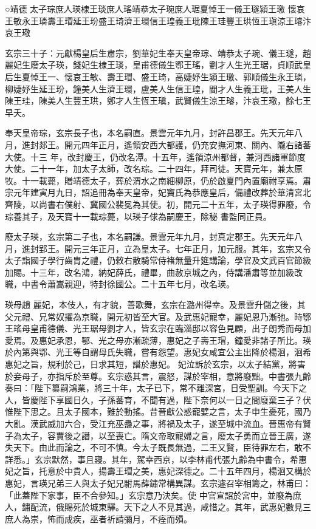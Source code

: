 
\begin{pinyinscope}

 ○靖德
 太子琮庶人瑛棣王琰庶人瑤靖恭太子琬庶人琚夏悼王一儀王璲潁王璬
 懷哀王敏永王璘壽王瑁延王玢盛王琦濟王環信王瑝義王玭陳王珪豐王珙恆王瑱涼王璿汴哀王璥



 玄宗三十子：元獻楊皇后生肅宗，劉華妃生奉天皇帝琮、靖恭太子琬、儀王璲，趙麗妃生廢太子瑛，錢妃生棣王琰，皇甫德儀生鄂王瑤，劉才人生光王琚，貞順武皇
 后生夏悼王一、懷哀王敏、壽王瑁、盛王琦，高婕妤生潁王璬、郭順儀生永王璘，柳婕妤生延王玢，鐘美人生濟王環，盧美人生信王瑝，閻才人生義王玭，王美人生陳王珪，陳美人生豐王珙，鄭才人生恆王瑱，武賢儀生涼王璿，汴哀王璥，餘七王早夭。



 奉天皇帝琮，玄宗長子也，本名嗣直。景雲元年九月，封許昌郡王。先天元年八月，進封郯王。開元四年正月，遙領安西大都護，仍充安撫河東、關內、隴右諸蕃大使。十三
 年，改封慶王，仍改名潭。十五年，遙領涼州都督，兼河西諸軍節度大使。二十一年，加太子太師，改名琮。二十四年，拜司徒。天寶元年，兼太原牧。十一載薨，贈靖德太子，葬於渭水之南細柳原，仍於啟夏門內置廟祔享焉。肅宗元年建寅月九日，詔追冊為奉天皇帝，妃竇氏為恭應皇后，備禮改葬於華清宮北齊陵，以尚書右僕射、冀國公裴冕為其使。初，開元二十五年，太子瑛得罪廢，令琮養其子，及天寶十一載琮薨，以瑛子俅為嗣慶王，除秘
 書監同正員。



 廢太子瑛，玄宗第二子也，本名嗣謙。景雲元年九月，封真定郡王。先天元年八月，進封郢王。開元三年正月，立為皇太子。七年正月，加元服。其年，玄宗又令太子詣國子學行齒胄之禮，仍敕右散騎常侍褚無量升筵講論，學官及文武百官節級加賜。十三年，改名鴻，納妃薛氏，禮畢，曲赦京城之內，侍講潘肅等並加級改職，中書令蕭嵩親迎，特封徐國公。二十五年七月，改名瑛。



 瑛母趙
 麗妃，本伎人，有才貌，善歌舞，玄宗在潞州得幸。及景雲升儲之後，其父元禮、兄常奴擢為京職，開元初皆至大官。及武惠妃寵幸，麗妃恩乃漸弛。時鄂王瑤母皇甫德儀、光王琚母劉才人，皆玄宗在臨淄邸以容色見顧，出子朗秀而母加愛焉。及惠妃承恩，鄂、光之母亦漸疏薄，惠妃之子壽王瑁，鐘愛非諸子所比。瑛於內第與鄂、光王等自謂母氏失職，嘗有怨望。惠妃女咸宜公主出降於楊洄，洄希惠妃之旨，規利於己，日求其短，譖於惠妃。
 妃泣訴於玄宗，以太子結黨，將害於妾母子，亦指斥於至尊。玄宗惑其言，震怒，謀於宰相，意將廢黜。中書張九齡奏曰：「陛下纂嗣鴻業，將三十年，太子已下，常不離深宮，日受聖訓。今天下之人，皆慶陛下享國日久，子孫蕃育，不聞有過，陛下奈何以一日之間廢棄三子？伏惟陛下思之。且太子國本，難於動搖。昔晉獻公惑寵嬖之言，太子申生憂死，國乃大亂。漢武威加六合，受江充巫蠱之事，將禍及太子，遂至城中流血。晉惠帝有賢
 子為太子，容賈後之譖，以至喪亡。隋文帝取寵婦之言，廢太子勇而立晉王廣，遂失天下。由此而論之，不可不慎。今太子既長無過，二王又賢，臣待罪左右，敢不詳悉。」玄宗默然，事且寢。其年，駕幸西京，以李林甫代張九齡為中書令，希惠妃之旨，托意於中貴人，揚壽王瑁之美，惠妃深德之。二十五年四月，楊洄又構於惠妃，言瑛兄弟三人與太子妃兄駙馬薛鏽常構異謀。玄宗遽召宰相籌之，林甫曰：「此蓋陛下家事，臣不合參知。」玄宗意乃決矣。使
 中官宣詔於宮中，並廢為庶人，鏽配流，俄賜死於城東驛。天下之人不見其過，咸惜之。其年，武惠妃數見三庶人為崇，怖而成疾，巫者祈請彌月，不痊而殞。




\end{pinyinscope}
